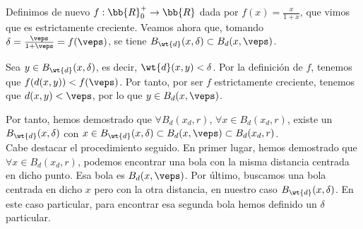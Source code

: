 \begin{ejercicio}
\begin{enumerate}
        Definimos de nuevo $f:\bb{R}^+_0\to \bb{R}$ dada por $f(x)=\frac{x}{1+x}$, que vimos que es estrictamente creciente. Veamos ahora que, tomando $\delta=\frac{\veps}{1+\veps}=f(\veps)$, se tiene $B_{\wt{d}}(x,\delta)\subset B_d(x,\veps)$.
        
        Sea $y\in B_{\wt{d}}(x,\delta)$, es decir, $\wt{d}(x,y)<\delta$. Por la definición de $f$, tenemos que $f(d(x,y))<f(\veps)$. Por tanto, por ser $f$ estrictamente creciente, tenemos que $d(x,y)<\veps$, por lo que $y\in B_d(x,\veps)$.

        Por tanto, hemos demostrado que $\forall B_{d}(x_d, r)$, $\forall x\in B_{d}(x_d, r)$, existe un $B_{\wt{d}}(x,\delta)$ con $x\in B_{\wt{d}}(x,\delta)\subset B_d(x,\veps)\subset B_{d}(x_d, r)$.\\

        Cabe destacar el procedimiento seguido. En primer lugar, hemos demostrado que $\forall x\in B_{d}(x_d, r)$, podemos encontrar una bola con la misma distancia centrada en dicho punto. Esa bola es $B_d(x,\veps)$. Por último, buscamos una bola centrada en dicho $x$ pero con la otra distancia, en nuestro caso $B_{\wt{d}}(x,\delta)$. En este caso particular, para encontrar esa segunda bola hemos definido un $\delta$ particular.
    \end{enumerate}
\end{ejercicio}



